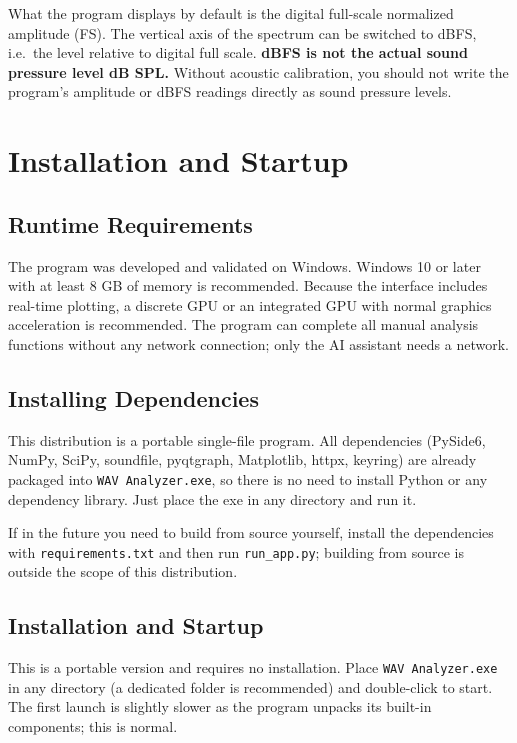 \documentclass[UTF8,a4paper,12pt]{ctexart}
\begin{document}
What the program displays by default is the digital full-scale normalized amplitude (FS). The vertical axis of the spectrum can be switched to dBFS, i.e.\ the level relative to digital full scale. \textbf{dBFS is not the actual sound pressure level dB SPL.} Without acoustic calibration, you should not write the program's amplitude or dBFS readings directly as sound pressure levels.

\section{Installation and Startup}

\subsection{Runtime Requirements}

The program was developed and validated on Windows. Windows 10 or later with at least 8 GB of memory is recommended. Because the interface includes real-time plotting, a discrete GPU or an integrated GPU with normal graphics acceleration is recommended. The program can complete all manual analysis functions without any network connection; only the AI assistant needs a network.

\subsection{Installing Dependencies}

This distribution is a portable single-file program. All dependencies (PySide6, NumPy, SciPy, soundfile, pyqtgraph, Matplotlib, httpx, keyring) are already packaged into \texttt{WAV Analyzer.exe}, so there is no need to install Python or any dependency library. Just place the exe in any directory and run it.

If in the future you need to build from source yourself, install the dependencies with \texttt{requirements.txt} and then run \texttt{run\_app.py}; building from source is outside the scope of this distribution.

\subsection{Installation and Startup}

This is a portable version and requires no installation. Place \texttt{WAV Analyzer.exe} in any directory (a dedicated folder is recommended) and double-click to start. The first launch is slightly slower as the program unpacks its built-in components; this is normal.
\end{document}
